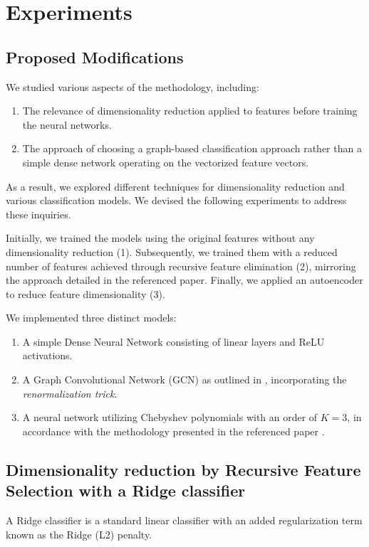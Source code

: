 \section{Experiments}

\subsection{Proposed Modifications}
We studied various aspects of the methodology, including:
\begin{enumerate}
    \item The relevance of dimensionality reduction applied to features before training the neural networks.
    \item The approach of choosing a graph-based classification approach rather than a simple dense network operating on the vectorized feature vectors.
\end{enumerate}
As a result, we explored different techniques for dimensionality reduction and various classification models. We devised the following experiments to address these inquiries.

Initially, we trained the models using the original features without any dimensionality reduction (1). Subsequently, we trained them with a reduced number of features achieved through recursive feature elimination (2), mirroring the approach detailed in the referenced paper. Finally, we applied an autoencoder to reduce feature dimensionality (3).

We implemented three distinct models:
\begin{enumerate}
    \item A simple Dense Neural Network consisting of linear layers and ReLU activations.
    \item A Graph Convolutional Network (GCN) as outlined in \cite{kipf_semi-supervised_2017}, incorporating the \textit{renormalization trick}.
    \item A neural network utilizing Chebyshev polynomials with an order of $K=3$, in accordance with the methodology presented in the referenced paper \cite{Parisot17}.
\end{enumerate}


\subsection{Dimensionality reduction by Recursive Feature Selection with a Ridge classifier}

A Ridge classifier is a standard linear classifier with an added regularization term known as the Ridge (L2) penalty.

